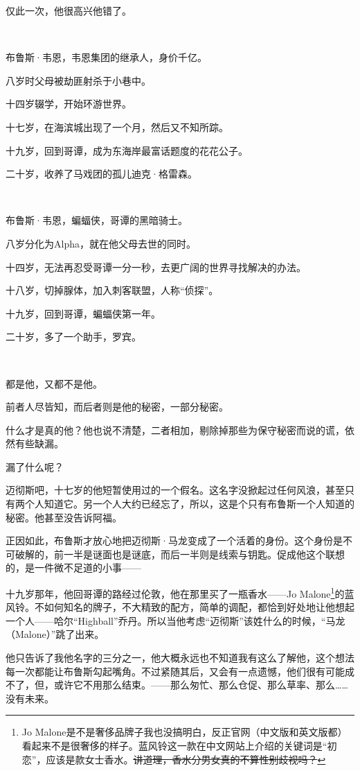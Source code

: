\documentclass[../main]{subfiles}
\begin{document}
仅此一次，他很高兴他错了。

~\

布鲁斯·韦恩，韦恩集团的继承人，身价千亿。

八岁时父母被劫匪射杀于小巷中。

十四岁辍学，开始环游世界。

十七岁，在海滨城出现了一个月，然后又不知所踪。

十九岁，回到哥谭，成为东海岸最富话题度的花花公子。

二十岁，收养了马戏团的孤儿迪克·格雷森。

~\

布鲁斯·韦恩，蝙蝠侠，哥谭的黑暗骑士。

八岁分化为Alpha，就在他父母去世的同时。

十四岁，无法再忍受哥谭一分一秒，去更广阔的世界寻找解决的办法。

十八岁，切掉腺体，加入刺客联盟，人称“侦探”。

十九岁，回到哥谭，蝙蝠侠第一年。

二十岁，多了一个助手，罗宾。

~\

都是他，又都不是他。

前者人尽皆知，而后者则是他的秘密，一部分秘密。

什么才是真的他？他也说不清楚，二者相加，剔除掉那些为保守秘密而说的谎，依然有些缺漏。

漏了什么呢？

迈彻斯吧，十七岁的他短暂使用过的一个假名。这名字没掀起过任何风浪，甚至只有两个人知道它。另一个人大约已经忘了，所以，这是个只有布鲁斯一个人知道的秘密。他甚至没告诉阿福。

正因如此，布鲁斯才放心地把迈彻斯·马龙变成了一个活着的身份。这个身份是不可破解的，前一半是谜面也是谜底，而后一半则是线索与钥匙。促成他这个联想的，是一件微不足道的小事——

十九岁那年，他回哥谭的路经过伦敦，他在那里买了一瓶香水——Jo Malone\footnote[1]{Jo Malone是不是奢侈品牌子我也没搞明白，反正官网（中文版和英文版都）看起来不是很奢侈的样子。蓝风铃这一款在中文网站上介绍的关键词是“初恋”，应该是款女士香水。\sout{讲道理，香水分男女真的不算性别歧视吗？}}的蓝风铃。不如何知名的牌子，不大精致的配方，简单的调配，都恰到好处地让他想起一个人——哈尔“Highball”乔丹。所以当他考虑“迈彻斯”该姓什么的时候，“马龙（Malone）”跳了出来。

他只告诉了我他名字的三分之一，他大概永远也不知道我有这么了解他，这个想法每一次都能让布鲁斯勾起嘴角。不过紧随其后，又会有一点遗憾，他们很有可能成不了，但，或许它不用那么结束。——那么匆忙、那么仓促、那么草率、那么……没有未来。
\end{document}
